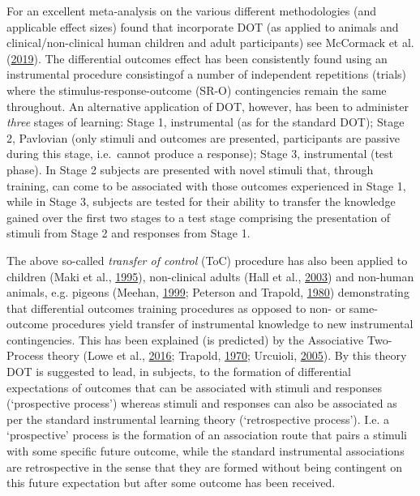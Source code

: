 \documentclass[]{elsarticle} %
\begin{document}
For an excellent meta-analysis on the various different methodologies
(and applicable effect sizes) found that incorporate DOT (as applied to
animals and clinical/non-clinical human children and adult participants)
see McCormack et al.
(\protect\hyperlink{ref-mccormack2019quantifying}{2019}). The
differential outcomes effect has been consistently found using an
instrumental procedure consistingof a number of independent repetitions
(trials) where the stimulus-response-outcome (SR-O) contingencies remain
the same throughout. An alternative application of DOT, however, has
been to administer \emph{three} stages of learning: Stage 1,
instrumental (as for the standard DOT); Stage 2, Pavlovian (only stimuli
and outcomes are presented, participants are passive during this stage,
i.e.~cannot produce a response); Stage 3, instrumental (test phase). In
Stage 2 subjects are presented with novel stimuli that, through
training, can come to be associated with those outcomes experienced in
Stage 1, while in Stage 3, subjects are tested for their ability to
transfer the knowledge gained over the first two stages to a test stage
comprising the presentation of stimuli from Stage 2 and responses from
Stage 1.

The above so-called \emph{transfer of control} (ToC) procedure has also
been applied to children (Maki et al.,
\protect\hyperlink{ref-maki1995expectancies}{1995}), non-clinical adults
(Hall et al., \protect\hyperlink{ref-hall2003acquired}{2003}) and
non-human animals, e.g. pigeons (Meehan,
\protect\hyperlink{ref-meehan1999class}{1999}; Peterson and Trapold,
\protect\hyperlink{ref-peterson1980effects}{1980}) demonstrating that
differential outcomes training procedures as opposed to non- or
same-outcome procedures yield transfer of instrumental knowledge to new
instrumental contingencies. This has been explained (is predicted) by
the Associative Two-Process theory (Lowe et al.,
\protect\hyperlink{ref-lowe2016minimalist}{2016}; Trapold,
\protect\hyperlink{ref-trapold1970expectancies}{1970}; Urcuioli,
\protect\hyperlink{ref-urcuioli2005behavioral}{2005}). By this theory
DOT is suggested to lead, in subjects, to the formation of differential
expectations of outcomes that can be associated with stimuli and
responses (`prospective process') whereas stimuli and responses can also
be associated as per the standard instrumental learning theory
(`retrospective process'). I.e. a `prospective' process is the formation
of an association route that pairs a stimuli with some specific future
outcome, while the standard instrumental associations are retrospective
in the sense that they are formed without being contingent on this
future expectation but after some outcome has been received.
\end{document}
